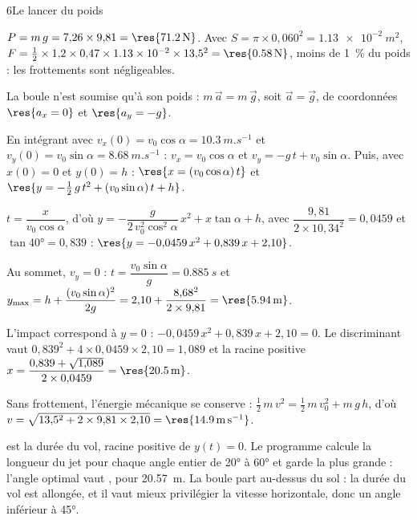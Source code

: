 \begin{corrigeBac}{6}{Le lancer du poids}
\begin{questions}
\item $P=m\,g=7{,}26\times9{,}81=\res{\qty{71,2}{N}}$. Avec $S=\pi\times0{,}060^2=\qty{1,13e-2}{m^2}$,
$F=\frac12\times1{,}2\times0{,}47\times\num{1.13e-2}\times13{,}5^2=\res{\qty{0,58}{N}}$, moins de 1~\% du poids : les frottements sont
négligeables. 
\item La boule n'est soumise qu'à son poids : $m\,\vec a=m\,\vec g$, soit $\vec a=\vec g$, de coordonnées $\res{a_x=0}$ et
$\res{a_y=-g}$. 
\item En intégrant avec $v_x(0)=v_0\cos\alpha=\qty{10,3}{m.s^{-1}}$ et $v_y(0)=v_0\sin\alpha=\qty{8,68}{m.s^{-1}}$ : $v_x=v_0\cos\alpha$ et
$v_y=-g\,t+v_0\sin\alpha$. Puis, avec $x(0)=0$ et $y(0)=h$ : $\res{x=(v_0\cos\alpha)\,t}$ et
$\res{y=-\frac12\,g\,t^2+(v_0\sin\alpha)\,t+h}$. 
\item $t=\dfrac{x}{v_0\cos\alpha}$, d'où $y=-\dfrac{g}{2\,v_0^2\cos^2\alpha}\,x^2+x\tan\alpha+h$, avec $\dfrac{9{,}81}{2\times10{,}34^2}=0{,}0459$ et
$\tan\ang{40}=0{,}839$ : $\res{y=-0{,}0459\,x^2+0{,}839\,x+2{,}10}$. 
\item Au sommet, $v_y=0$ : $t=\dfrac{v_0\sin\alpha}{g}=\qty{0,885}{s}$ et
$y_\mathrm{max}=h+\dfrac{(v_0\sin\alpha)^2}{2g}=2{,}10+\dfrac{8{,}68^2}{2\times9{,}81}=\res{\qty{5,94}{m}}$. 
\item L'impact correspond à $y=0$ : $-0{,}0459\,x^2+0{,}839\,x+2{,}10=0$. Le discriminant vaut
$0{,}839^2+4\times0{,}0459\times2{,}10=1{,}089$ et la racine positive
$x=\dfrac{0{,}839+\sqrt{1{,}089}}{2\times0{,}0459}=\res{\qty{20,5}{m}}$. \pts{1 pt}
\item Sans frottement, l'énergie mécanique se conserve : $\frac12\,m\,v^2=\frac12\,m\,v_0^2+m\,g\,h$, d'où
$v=\sqrt{13{,}5^2+2\times9{,}81\times2{,}10}=\res{\qty{14,9}{m.s^{-1}}}$. 
\item {} est la durée du vol, racine positive de $y(t)=0$. Le programme calcule la longueur du jet pour chaque angle
entier de \ang{20} à \ang{60} et garde la plus grande : l'angle optimal vaut , pour \qty{20,57}{m}. La boule part
au-dessus du sol : la durée du vol est allongée, et il vaut mieux privilégier la vitesse horizontale, donc un angle
inférieur à \ang{45}. 
\end{questions}
\end{corrigeBac}

